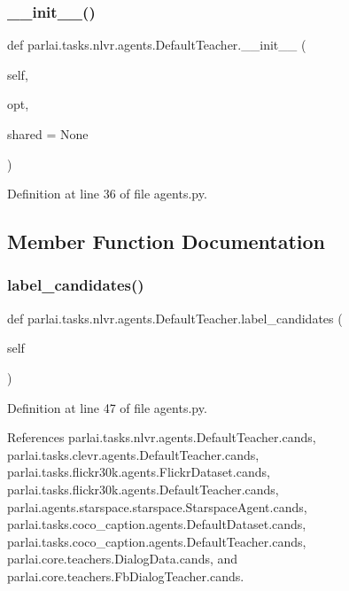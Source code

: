 \subsubsection{\texorpdfstring{\+\_\+\+\_\+init\+\_\+\+\_\+()}{\_\_init\_\_()}}
{\footnotesize\ttfamily def parlai.\+tasks.\+nlvr.\+agents.\+Default\+Teacher.\+\_\+\+\_\+init\+\_\+\+\_\+ (\begin{DoxyParamCaption}\item[{}]{self,  }\item[{}]{opt,  }\item[{}]{shared = {\ttfamily None} }\end{DoxyParamCaption})}



Definition at line 36 of file agents.\+py.



\subsection{Member Function Documentation}
\mbox{\label{classparlai_1_1tasks_1_1nlvr_1_1agents_1_1DefaultTeacher_adb1e3953e1686ae29212e74ad542ae35}} 
\subsubsection{\texorpdfstring{label\+\_\+candidates()}{label\_candidates()}}
{\footnotesize\ttfamily def parlai.\+tasks.\+nlvr.\+agents.\+Default\+Teacher.\+label\+\_\+candidates (\begin{DoxyParamCaption}\item[{}]{self }\end{DoxyParamCaption})}



Definition at line 47 of file agents.\+py.



References parlai.\+tasks.\+nlvr.\+agents.\+Default\+Teacher.\+cands, parlai.\+tasks.\+clevr.\+agents.\+Default\+Teacher.\+cands, parlai.\+tasks.\+flickr30k.\+agents.\+Flickr\+Dataset.\+cands, parlai.\+tasks.\+flickr30k.\+agents.\+Default\+Teacher.\+cands, parlai.\+agents.\+starspace.\+starspace.\+Starspace\+Agent.\+cands, parlai.\+tasks.\+coco\+\_\+caption.\+agents.\+Default\+Dataset.\+cands, parlai.\+tasks.\+coco\+\_\+caption.\+agents.\+Default\+Teacher.\+cands, parlai.\+core.\+teachers.\+Dialog\+Data.\+cands, and parlai.\+core.\+teachers.\+Fb\+Dialog\+Teacher.\+cands.

